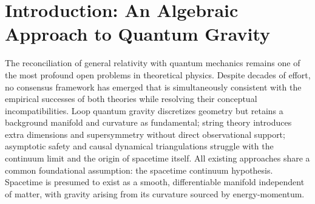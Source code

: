 \documentclass[a4paper]{article}
\begin{document}
\begin{abstract}
and the symmetric states, of total spin $1$; two dual spinors on one ray cannot occupy the singlet. The orthogonal complement of that ray is the spin-reversed partner, and the two rays exhaust the space. The singlet correlation along two axes is $-a\cdot b$; no local operation on one particle changes the statistics of the other, and the CHSH combination reaches $2\sqrt2$, beyond the bound $2$ that holds whenever each outcome is fixed by variables of its own particle.

The algebra does not fix the dynamics. Equal-scale interference nodes run inward and do not reproduce the Bohr radii. One revolution of the dual rotor restores every point of its orbit and leaves the rotor at $-1$, at every radius, and that return contains no momentum. The matter wave is the de Broglie phase $(Et-\mathbf{p}\cdot\mathbf{x})/\hbar$. It is not closed into a radius $n^2 a_0$. The scale of the repulsive layers is the electromagnetic length. The written opposite-sign particle action frees the lag and sources the common rapidity. The mismatch of the angles is their product, and positive stiffness drives a nonzero lag to $-\infty$. Its Jacobi integral is indefinite, and the harmonic stiffness neither restores a frequency nor selects a misalignment. The value of the mass, measurement, and the path integral remain geometric hypotheses, and the internal duality of the algebra is not ten-dimensional spacetime supersymmetry.
\end{abstract}

\section{Introduction: An Algebraic Approach to Quantum Gravity}

The reconciliation of general relativity with quantum mechanics remains one of the most profound open problems in theoretical physics. Despite decades of effort, no consensus framework has emerged that is simultaneously consistent with the empirical successes of both theories while resolving their conceptual incompatibilities. Loop quantum gravity discretizes geometry but retains a background manifold and curvature as fundamental; string theory introduces extra dimensions and supersymmetry without direct observational support; asymptotic safety and causal dynamical triangulations struggle with the continuum limit and the origin of spacetime itself. All existing approaches share a common foundational assumption: the spacetime continuum hypothesis. Spacetime is presumed to exist as a smooth, differentiable manifold independent of matter, with gravity arising from its curvature sourced by energy-momentum.
\end{document}
